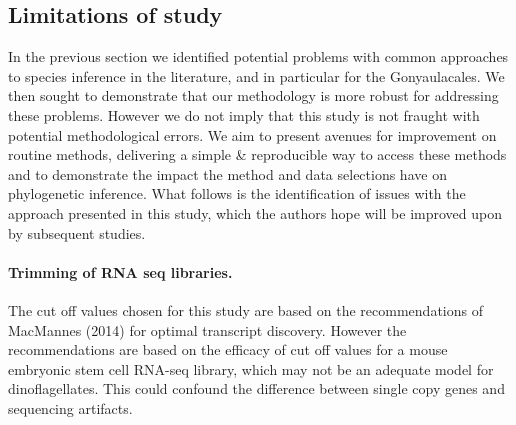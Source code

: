\documentclass[12pt]{article}
\begin{document}
\subsection*{Limitations of study}
In the previous section we identified potential problems with common approaches to species inference in the literature, and in particular for the Gonyaulacales. 
We then sought to demonstrate that our methodology is more robust for addressing these problems. 
However we do not imply that this study is not fraught with potential methodological errors. 
We aim to present avenues for improvement on routine methods, delivering a simple \& reproducible way to access these methods and to demonstrate the impact the method and data selections have on phylogenetic inference. %
What follows is the identification of issues with the approach presented in this study, which the authors hope will be improved upon by subsequent studies. 
\paragraph*{Trimming of RNA seq libraries.} The cut off values chosen for this study are based on the recommendations of MacMannes (2014) for optimal transcript discovery. 
However the recommendations are based on the efficacy of cut off values for a mouse embryonic stem cell RNA-seq library, which may not be an adequate model for dinoflagellates. 
This could confound the difference between single copy genes and sequencing artifacts.
\end{document}
